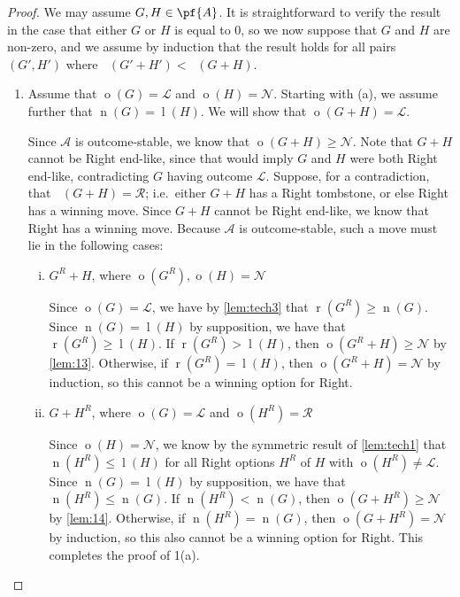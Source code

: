\documentclass[11pt]{article}
\theoremstyle{definition}
\DeclareMathOperator{\outcome}{o}
\DeclareMathOperator{\outcomeR}{o_R}
\DeclareMathOperator{\birth}{\tilde{b}}
\newcommand{\set}[1]{\mathcal{#1}}
\DeclareMathOperator{\ltp}{l}
\DeclareMathOperator{\ntp}{n}
\DeclareMathOperator{\rtp}{r}
\begin{document}
\begin{proof}
    We may assume $G,H\in\pf{A}$. It is straightforward to verify the result in
    the case that either $G$ or $H$ is equal to 0, so we now suppose that $G$
    and $H$ are non-zero, and we assume by induction that the result holds for
    all pairs $(G',H')$ where $\birth(G'+H')<\birth(G+H)$.

    \begin{enumerate}
        \item Assume that $\outcome(G)=\mathscr{L}$ and
            $\outcome(H)=\mathscr{N}$. Starting with (a), we assume further
            that $\ntp(G)=\ltp(H)$. We will show that
            $\outcome(G+H)=\mathscr{L}$.

            Since $\set{A}$ is outcome-stable, we know that
            $\outcome(G+H)\geq\mathscr{N}$. Note that $G+H$ cannot be Right
            end-like, since that would imply $G$ and $H$ were both Right
            end-like, contradicting $G$ having outcome $\mathscr{L}$. Suppose,
            for a contradiction, that $\outcomeR(G+H)=\mathscr{R}$; i.e.\
            either $G+H$ has a Right tombstone, or else Right has a winning
            move. Since $G+H$ cannot be Right end-like, we know that Right has
            a winning move. Because $\set{A}$ is outcome-stable, such a move
            must lie in the following cases:
            \begin{enumerate}[i)]
                \item
                    $G^R+H$, where $\outcome(G^R),\outcome(H)=\mathscr{N}$

                    Since $\outcome(G)=\mathscr{L}$, we have by
                    \cref{lem:tech3} that $\rtp(G^R)\geq\ntp(G)$. Since
                    $\ntp(G)=\ltp(H)$ by supposition, we have that
                    $\rtp(G^R)\geq\ltp(H)$. If $\rtp(G^R)>\ltp(H)$, then
                    $\outcome(G^R+H)\geq\mathscr{N}$ by \cref{lem:13}.
                    Otherwise, if $\rtp(G^R)=\ltp(H)$, then
                    $\outcome(G^R+H)=\mathscr{N}$ by induction, so this cannot
                    be a winning option for Right.
                \item
                    $G+H^R$, where $\outcome(G)=\mathscr{L}$ and
                    $\outcome(H^R)=\mathscr{R}$

                    Since $\outcome(H)=\mathscr{N}$, we know by the symmetric
                    result of \cref{lem:tech1} that $\ntp(H^R)\leq\ltp(H)$ for
                    all Right options $H^R$ of $H$ with
                    $\outcome(H^R)\neq\mathscr{L}$. Since $\ntp(G)=\ltp(H)$ by
                    supposition, we have that $\ntp(H^R)\leq\ntp(G)$. If
                    $\ntp(H^R)<\ntp(G)$, then $\outcome(G+H^R)\geq\mathscr{N}$
                    by \cref{lem:14}. Otherwise, if $\ntp(H^R)=\ntp(G)$, then
                    $\outcome(G+H^R)=\mathscr{N}$ by induction, so this also
                    cannot be a winning option for Right. This completes the
                    proof of 1(a).
            \end{enumerate}


\end{enumerate}
\end{proof}
\end{document}
